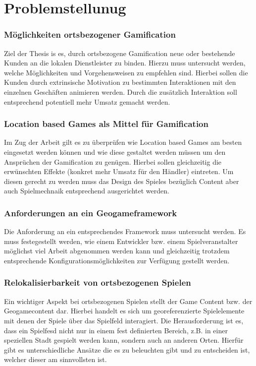 \chapter{Problemstellunug}
\label{sec:S2_Problemstellunug}

\subsection*{Möglichkeiten ortsbezogener Gamification}

Ziel der Thesis is es, durch ortsbezogene Gamification neue oder bestehende Kunden an die lokalen Dienstleister zu binden.
Hierzu muss untersucht werden, welche Möglichkeiten und Vorgehensweisen zu empfehlen sind.
Hierbei sollen die Kunden durch extrinsische Motivation zu bestimmten Interaktionen mit den einzelnen Geschäften animieren werden.
Durch die zusätzlich Interaktion soll entsprechend potentiell mehr Umsatz gemacht werden.

\subsection*{Location based Games als Mittel für Gamification}

Im Zug der Arbeit gilt es zu überprüfen wie Location based Games am besten eingesetzt werden können und wie diese gestaltet werden müssen um den Ansprüchen der Gamification zu genügen. Hierbei sollen gleichzeitig die erwünschten Effekte (konkret mehr Umsatz für den Händler) eintreten. Um diesen gerecht zu werden muss das Design des Spieles bezüglich Content aber auch Spielmechnaik entsprechend ausgerichtet werden.

\subsection*{Anforderungen an ein Geogameframework}

Die Anforderung an ein entsprechendes Framework muss untersucht werden. Es muss festegestellt werden, wie einem Entwickler bzw. einem Spielveranstalter möglichst viel Arbeit abgenommen werden kann und gleichzeitig trotzdem entsprechende Konfigurationsmöglichkeiten zur Verfügung gestellt werden.

\subsection*{Relokalisierbarkeit von ortsbezogenen Spielen}

Ein wichtiger Aspekt bei ortsbezogenen Spielen stellt der Game Content bzw. der Geogamecontent dar. Hierbei handelt es sich um georeferenzierte Spielelemente mit denen der Spiele über das Spielfeld interagiert. Die Herausforderung ist es, dass ein Spielfesd nicht nur in einem fest definierten Bereich, z.B. in einer speziellen Stadt gespielt werden kann, sondern auch an anderen Orten. Hierfür gibt es unterschiedliche Ansätze die es zu beleuchten gibt und zu entscheiden ist, welcher dieser am sinnvollsten ist.

